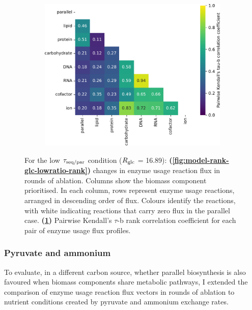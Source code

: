 \begin{figure}
\begin{subfigure}[t]{0.45\textwidth}
    \includegraphics[width=\linewidth]{CompareEnzUse_glc16p89_pyrUnres_ammUnres_2.pdf}
    \caption{
    }
    \label{fig:model-rank-glc-lowratio-kendall}
  \end{subfigure}

  \caption[
    Changes in enzyme usage reaction flux and Kendall's $\tau$-b rank correlation coefficient for each pair, $\exchrate{glc}$ = \SI{16.89}{\mmolgdwh}.
  ]{
    For the low $\tau_{\mathrm{seq}/\mathrm{par}}$ condition ($\exchrate{glc}$ = \SI{16.89}{\mmolgdwh}):
    \textbf{(\ref{fig:model-rank-glc-lowratio-rank})}
    changes in enzyme usage reaction flux in rounds of ablation.
    Columns show the biomass component prioritised.
    In each column, rows represent enzyme usage reactions, arranged in descending order of flux.
    Colours identify the reactions, with white indicating reactions that carry zero flux in the parallel case.
    \textbf{(\ref{fig:model-rank-glc-lowratio-kendall})}
    Pairwise Kendall's $\tau$-b rank correlation coefficient \parencite{kendallTREATMENTTIESRANKING1945} for each pair of enzyme usage flux profiles.
  }
  \label{fig:model-rank-glc-lowratio}
\end{figure}


\subsubsection{Pyruvate and ammonium}
\label{subsec:model-rank-pyruvate}

To evaluate, in a different carbon source, whether parallel biosynthesis is also favoured when biomass components share metabolic pathways, I extended the comparison of enzyme usage reaction flux vectors in rounds of ablation to nutrient conditions created by pyruvate and ammonium exchange rates.

